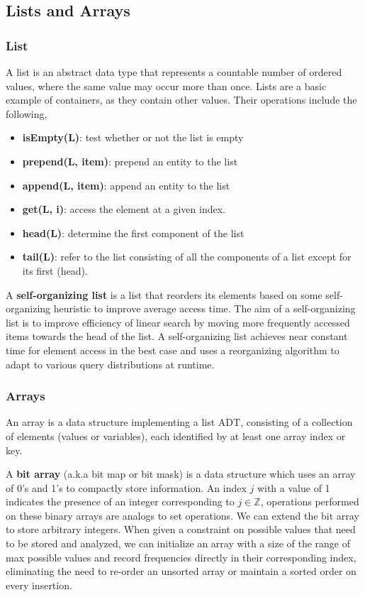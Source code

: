 \documentclass{article}
\begin{document}
    \subsection{Lists and Arrays}
    \subsubsection{List}
    A list is an abstract data type that represents a countable number of ordered values, where the same value may occur more than once. Lists are a basic example of containers, as they contain other values. Their operations include the following,
    \begin{itemize}
        \item \textbf{isEmpty(L)}: test whether or not the list is empty
        \item \textbf{prepend(L, item)}: prepend an entity to the list
        \item \textbf{append(L, item)}: append an entity to the list
        \item \textbf{get(L, i)}: access the element at a given index.
        \item \textbf{head(L)}: determine the first component of the list
        \item \textbf{tail(L)}: refer to the list consisting of all the components of a list except for its first (head).
    \end{itemize}
    
    A \textbf{self-organizing list} is a list that reorders its elements based on some self-organizing heuristic to improve average access time. The aim of a self-organizing list is to improve efficiency of linear search by moving more frequently accessed items towards the head of the list. A self-organizing list achieves near constant time for element access in the best case and uses a reorganizing algorithm to adapt to various query distributions at runtime.
    
    \subsubsection{Arrays}
    An array is a data structure implementing a list ADT, consisting of a collection of elements (values or variables), each identified by at least one array index or key. 
    
    A \textbf{bit array} (a.k.a bit map or bit mask) is a data structure which uses an array of 0's and 1's to compactly store information. An index $j$ with a value of 1 indicates the presence of an integer corresponding to $j \in \mathbb Z$, operations performed on these binary arrays are analogs to set operations. We can extend the bit array to store arbitrary integers. When given a constraint on possible values that need to be stored and analyzed, we can initialize an array with a size of the range of max possible values and record frequencies directly in their corresponding index, eliminating the need to re-order an unsorted array or maintain a sorted order on every insertion.
    
\end{document}

